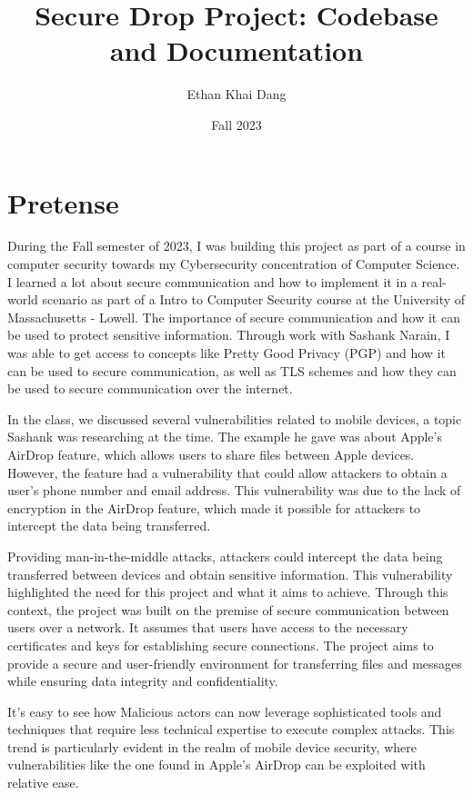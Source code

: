 \documentclass[12pt]{article}
\author{Ethan Khai Dang}
\date{Fall 2023}
\title{Secure Drop Project: Codebase and Documentation}
\begin{document}
\maketitle
\tableofcontents

\newpage

\section{Pretense}
During the Fall semester of 2023, I was building this project as part of a course in computer security towards my Cybersecurity concentration of Computer Science.
I learned a lot about secure communication and how to implement it in a real-world scenario as part of a Intro to Computer Security course at the University of Massachusetts - Lowell. 
The importance of secure communication and how it can be used to protect sensitive information.
Through work with Sashank Narain, I was able to get access to concepts like Pretty Good Privacy (PGP) and how it can be used to secure communication, as well as TLS schemes and how they can be used to secure communication over the internet.

In the class, we discussed several vulnerabilities related to mobile devices, a topic Sashank was researching at the time.
The example he gave was about Apple's AirDrop feature, which allows users to share files between Apple devices. However, the feature had a vulnerability that could allow attackers to obtain a user's phone number and email address. This vulnerability was due to the lack of encryption in the AirDrop feature, which made it possible for attackers to intercept the data being transferred.

Providing man-in-the-middle attacks, attackers could intercept the data being transferred between devices and obtain sensitive information. This vulnerability highlighted the need for this project and what it aims to achieve.
Through this context, the project was built on the premise of secure communication between users over a network. It assumes that users have access to the necessary certificates and keys for establishing secure connections. The project aims to provide a secure and user-friendly environment for transferring files and messages while ensuring data integrity and confidentiality.

It's easy to see how Malicious actors can now leverage sophisticated tools and techniques that require less technical expertise to execute complex attacks. This trend is particularly evident in the realm of mobile device security, where vulnerabilities like the one found in Apple's AirDrop can be exploited with relative ease.
\end{document}
